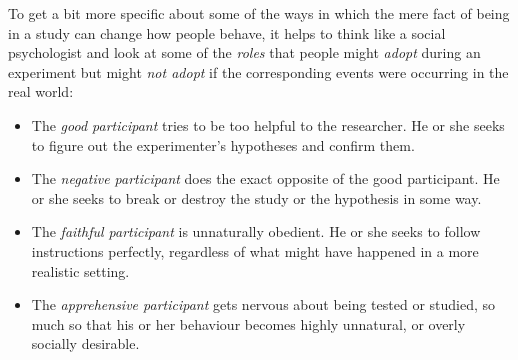 

To get a bit more specific about some of the ways in which the mere fact of being in a study can change how people behave, it helps to think like a social psychologist and look at some of the {\it roles} that people might {\it adopt} during an experiment but might {\it not adopt} if the corresponding events were occurring in the real world:
\begin{itemize}
\item The {\it good participant} tries to be too helpful to the researcher. He or she seeks to figure out the experimenter's hypotheses and confirm them.
\item The {\it negative participant} does the exact opposite of the good participant. He or she seeks to break or destroy the study or the hypothesis in some way.
\item The {\it faithful participant} is unnaturally obedient. He or she seeks to follow instructions perfectly, regardless of what might have happened in a more realistic setting.
\item The {\it apprehensive participant} gets nervous about being tested or studied, so much so that his or her behaviour becomes highly unnatural, or overly socially desirable.
\end{itemize}



